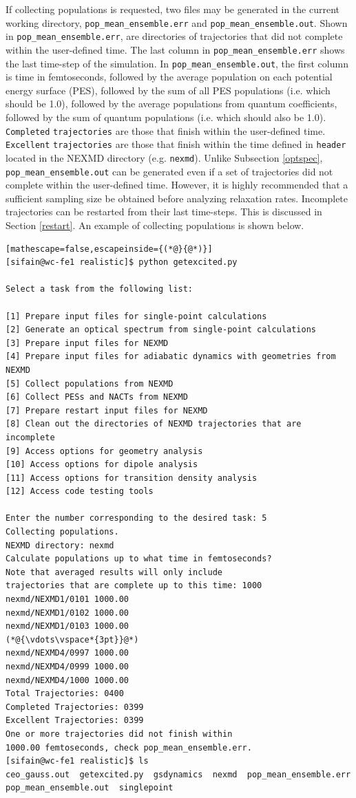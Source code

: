 \documentclass[letterpaper,12pt,titlepage]{article}
\begin{document}
If collecting populations is requested, two files may be generated in the current working directory, \verb+pop_mean_ensemble.err+ and \verb+pop_mean_ensemble.out+.  Shown in \verb+pop_mean_ensemble.err+, are directories of trajectories that did not complete within the user-defined time.  The last column in \verb+pop_mean_ensemble.err+ shows the last time-step of the simulation.  In \verb+pop_mean_ensemble.out+, the first column is time in femtoseconds, followed by the average population on each potential energy surface (PES), followed by the sum of all PES populations (i.e. which should be 1.0), followed by the average populations from quantum coefficients, followed by the sum of quantum populations (i.e. which should also be 1.0).  \verb+Completed+ \verb+trajectories+ are those that finish within the user-defined time.  \verb+Excellent+ \verb+trajectories+ are those that finish within the time defined in \verb+header+ located in the NEXMD directory (e.g. \verb+nexmd+).  Unlike Subsection \ref{optspec}, \verb+pop_mean_ensemble.out+ can be generated even if a set of trajectories did not complete within the user-defined time.  However, it is highly recommended that a sufficient sampling size be obtained before analyzing relaxation rates.  Incomplete trajectories can be restarted from their last time-steps.  This is discussed in Section \ref{restart}.  An example of collecting populations is shown below.
\begin{lstlisting}[mathescape=false,escapeinside={(*@}{@*)}]
[sifain@wc-fe1 realistic]$ python getexcited.py 

Select a task from the following list:

[1] Prepare input files for single-point calculations
[2] Generate an optical spectrum from single-point calculations
[3] Prepare input files for NEXMD
[4] Prepare input files for adiabatic dynamics with geometries from NEXMD
[5] Collect populations from NEXMD
[6] Collect PESs and NACTs from NEXMD
[7] Prepare restart input files for NEXMD
[8] Clean out the directories of NEXMD trajectories that are incomplete
[9] Access options for geometry analysis
[10] Access options for dipole analysis
[11] Access options for transition density analysis
[12] Access code testing tools

Enter the number corresponding to the desired task: 5
Collecting populations.
NEXMD directory: nexmd
Calculate populations up to what time in femtoseconds? 
Note that averaged results will only include
trajectories that are complete up to this time: 1000
nexmd/NEXMD1/0101 1000.00
nexmd/NEXMD1/0102 1000.00
nexmd/NEXMD1/0103 1000.00
(*@{\vdots\vspace*{3pt}}@*)
nexmd/NEXMD4/0997 1000.00
nexmd/NEXMD4/0999 1000.00
nexmd/NEXMD4/1000 1000.00
Total Trajectories: 0400
Completed Trajectories: 0399
Excellent Trajectories: 0399
One or more trajectories did not finish within 
1000.00 femtoseconds, check pop_mean_ensemble.err.
[sifain@wc-fe1 realistic]$ ls
ceo_gauss.out  getexcited.py  gsdynamics  nexmd  pop_mean_ensemble.err  pop_mean_ensemble.out  singlepoint
\end{lstlisting}
\end{document}
